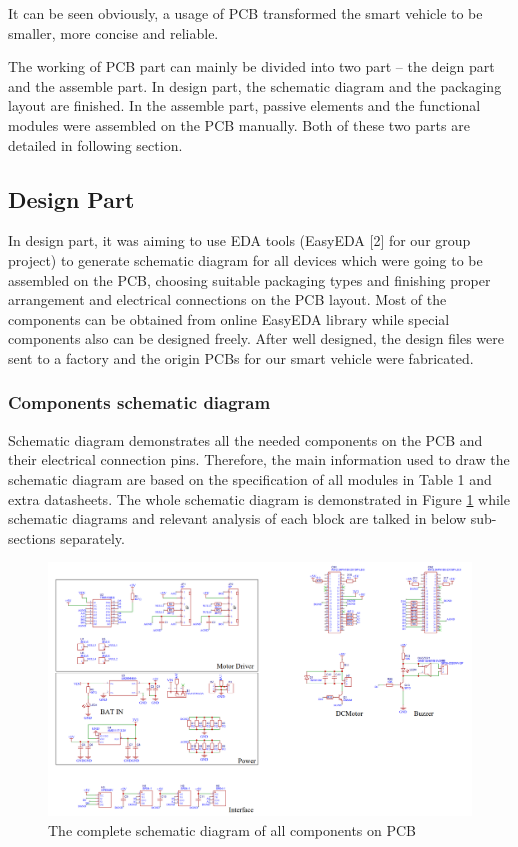 \documentclass[12pt, a4paper, oneside]{report}
\begin{document}
\newpage
\noindent
It can be seen obviously, a usage of PCB transformed the smart vehicle to be smaller, more concise and reliable. \vspace{0.5em}

\noindent
The working of PCB part can mainly be divided into two part – the deign part and the assemble part. In design part, the schematic diagram and the packaging layout are finished. In the assemble part, passive elements and the functional modules were assembled on the PCB manually. Both of these two parts are detailed in following section.
\subsection{Design Part}
In design part, it was aiming to use EDA tools (EasyEDA [2] for our group project) to generate schematic diagram for all devices which were going to be assembled on the PCB, choosing suitable packaging types and finishing proper arrangement and electrical connections on the PCB layout. Most of the components can be obtained from online EasyEDA library while special components also can be designed freely. After well designed, the design files were sent to a factory and the origin PCBs for our smart vehicle were fabricated.
\subsubsection{Components schematic diagram}
Schematic diagram demonstrates all the needed components on the PCB and their electrical connection pins. Therefore, the main information used to draw the schematic diagram are based on the specification of all modules in Table 1 and extra datasheets. The whole schematic diagram is demonstrated in Figure \ref{fig:pcb3} while schematic diagrams and relevant analysis of each block are talked in below sub-sections separately. 
\begin{figure}[!h]
	\centering
	\includegraphics[scale=0.35]{pic/PCB_figure/3_PCB.png}
	\caption{The complete schematic diagram of all components on PCB}
    \label{fig:pcb3}
\end{figure}
\end{document}

